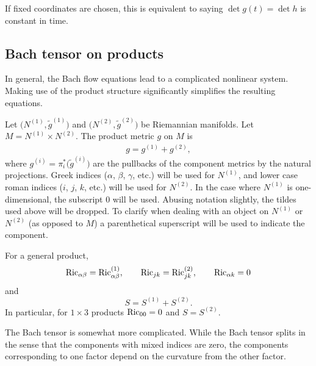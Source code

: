 \documentclass[10pt,a4paper]{amsart}
\numberwithin{equation}{section}
\begin{document}
If fixed coordinates are chosen, this is equivalent to saying $\det g(t) = \det h$ is constant in time.

\subsection{Bach tensor on products}

In general, the Bach flow equations lead to a complicated nonlinear system. Making use of the product structure significantly simplifies the resulting equations.

Let $\big(N^{(1)}, \tilde{g}^{(1)}\big)$ and $\big(N^{(2)}, \tilde{g}^{(2)}\big)$ be Riemannian manifolds. Let $M = N^{(1)} \times N^{(2)}$. The product metric $g$ on $M$ is
\begin{gather*}
g = g^{(1)} + g^{(2)},
\end{gather*}
where $g^{(i)}= \pi_i^*\big(\tilde{g}^{(i)}\big)$ are the pullbacks of the component metrics by the natural projections. Greek indices ($\alpha$, $\beta$, $\gamma$, etc.) will be used for $N^{(1)}$, and lower case roman indices ($i$, $j$, $k$, etc.) will be used for $N^{(2)}$. In the case where $N^{(1)}$ is one-dimensional, the subscript $0$ will be used. Abusing notation slightly, the tildes used above will be dropped. To clarify when dealing with an object on $N^{(1)}$ or $N^{(2)}$ (as opposed to $M$) a parenthetical superscript will be used to indicate the component.

For a general product,
\begin{gather*}
{\rm Ric}_{\alpha \beta} = {\rm Ric}^{(1)}_{\alpha \beta},\qquad
{\rm Ric}_{jk} = {\rm Ric}^{(2)}_{jk},\qquad
{\rm Ric}_{\alpha k} = 0
\end{gather*}
and
\[
S = S^{(1)} + S^{(2)}.
\]
In particular, for $1 \times 3$ products ${\rm Ric}_{00} = 0$ and $S = S^{(2)}$.

The Bach tensor is somewhat more complicated. While the Bach tensor splits in the sense that the components with mixed indices are zero, the components corresponding to one factor depend on the curvature from the other factor.
\end{document}
